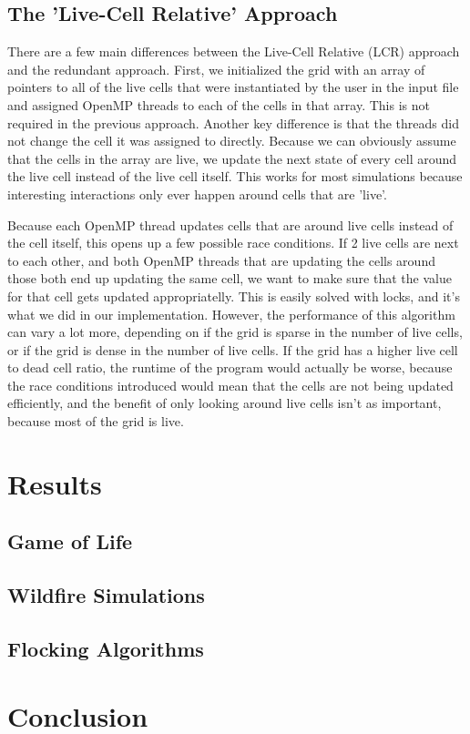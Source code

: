 \documentclass[12pt]{article}
\begin{document}
\subsection{The 'Live-Cell Relative' Approach}
There are a few main differences between the Live-Cell Relative (LCR) approach and the redundant approach. First, we initialized the grid with an array of pointers to all of the live cells that were instantiated by the user in the input file and assigned OpenMP threads to each of the cells in that array. This is not required in the previous approach. Another key difference is that the threads did not change the cell it was assigned to directly. Because we can obviously assume that the cells in the array are live, we update the next state of every cell around the live cell instead of the live cell itself. This works for most simulations because interesting interactions only ever happen around cells that are 'live'.

Because each OpenMP thread updates cells that are around live cells instead of the cell itself, this opens up a few possible race conditions. If 2 live cells are next to each other, and both OpenMP threads that are updating the cells around those both end up updating the same cell, we want to make sure that the value for that cell gets updated appropriatelly. This is easily solved with locks, and it's what we did in our implementation. However, the performance of this algorithm can vary a lot more, depending on if the grid is sparse in the number of live cells, or if the grid is dense in the number of live cells. If the grid has a higher live cell to dead cell ratio, the runtime of the program would actually be worse, because the race conditions introduced would mean that the cells are not being updated efficiently, and the benefit of only looking around live cells isn't as important, because most of the grid is live.

\section{Results}

\subsection{Game of Life}

\subsection{Wildfire Simulations}

\subsection{Flocking Algorithms}

\section{Conclusion}
\end{document}
